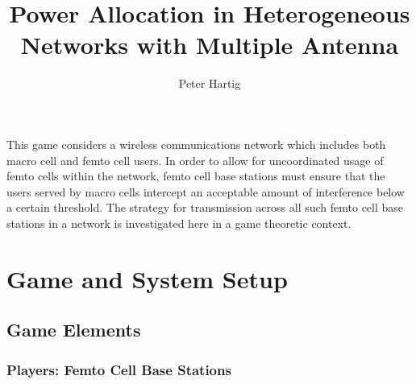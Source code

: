 \documentclass[12pt]{article}
\title{Power Allocation in Heterogeneous Networks with Multiple Antenna }
\author{Peter Hartig}
\begin{document}
\maketitle


This game considers a wireless communications network which includes both macro cell and femto cell users. In order to allow for uncoordinated usage of femto cells within the network, femto cell base stations must ensure that the users served by macro cells  intercept an acceptable amount of interference below a certain threshold. The strategy for transmission across all such femto cell base stations in a network is investigated here in a game theoretic context. 


\newpage
\tableofcontents
\newpage

\section{Game and System Setup}

\subsection{Game Elements}

\subsubsection{Players: Femto Cell Base Stations}
\end{document}
